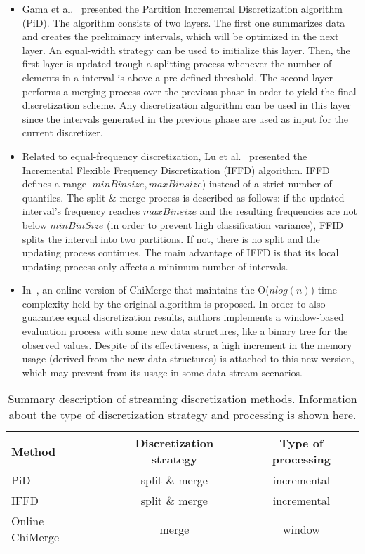 \documentclass[preprint,12pt]{elsarticle}
\begin{document}
\begin{itemize}
	\item Gama et al.~\cite{gama06} presented the Partition Incremental Discretization algorithm (PiD). The algorithm consists of two layers. The first one summarizes data and creates the preliminary intervals, which will be optimized in the next layer. An equal-width strategy can be used to initialize this layer. Then, the first layer is updated trough a splitting process whenever the number of elements in a interval is above a pre-defined threshold. The second layer performs a merging process over the previous phase in order to yield the final discretization scheme. Any discretization algorithm can be used in this layer since the intervals generated in the previous phase are used as input for the current discretizer.
	\item Related to equal-frequency discretization, Lu et al.~\cite{lu06} presented the Incremental Flexible Frequency Discretization (IFFD) algorithm. IFFD defines a range $[minBinsize, maxBinsize)$ instead of a strict number of quantiles. The split \& merge process is described as follows: if the updated interval's frequency reaches $maxBinsize$ and the resulting frequencies are not below $minBinSize$ (in order to prevent high classification variance), FFID splits the interval into two partitions. If not, there is no split and the updating process continues. The main advantage of IFFD is that its local updating process only affects a minimum number of intervals.
	\item In~\cite{lehti12}, an online version of ChiMerge that maintains the O($nlog(n)$) time complexity held by the original algorithm is proposed. In order to also guarantee equal discretization results, authors implements a window-based evaluation process with some new data structures, like a binary tree for the observed values. Despite of its effectiveness, a high increment in the memory usage (derived from the new data structures) is attached to this new version, which may prevent from its usage in some data stream scenarios.
\end{itemize}

\begin{table}[!htp]
\renewcommand{\arraystretch}{1.3}
\centering
\scriptsize
\caption{Summary description of streaming discretization methods. Information about the type of discretization strategy and processing is shown here.}
\label{tab:fs}
\begin{tabular}{ lcc }
\toprule
{\bf Method} & {\bf Discretization strategy} & {\bf Type of processing}\\
\midrule
PiD~\cite{gama06} & split \& merge & incremental\\
IFFD~\cite{lu06} & split \& merge & incremental\\
Online ChiMerge~\cite{lehti12} & merge & window\\
\bottomrule
\end{tabular}
\end{table}
\end{document}
